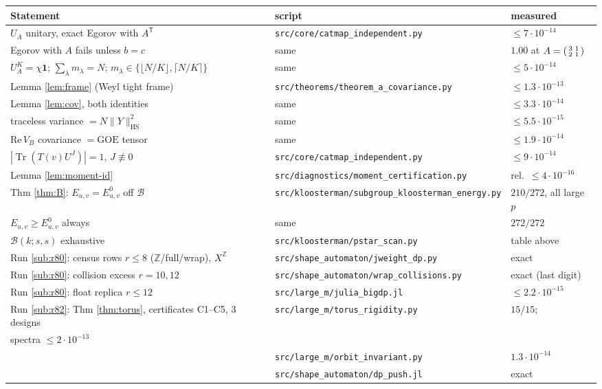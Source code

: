 \documentclass[11pt,reqno]{amsart}
\theoremstyle{definition}
\DeclareMathOperator{\Tr}{Tr}
\DeclareMathOperator{\HS}{HS}
\newcommand{\ZZ}{\mathbb{Z}}
\newcommand{\GOE}{\mathrm{GOE}}
\begin{document}
\begin{center}\small
\begin{tabular}{lll}
\toprule
Statement & script & measured\\
\midrule
$U_A$ unitary, exact Egorov with $A^{\mathsf T}$ &
 \texttt{src/core/catmap\_independent.py} & $\le7\!\cdot\!10^{-14}$\\
Egorov with $A$ fails unless $b=c$ & same & $1.00$ at
 $A=\begin{psmallmatrix}3&1\\2&1\end{psmallmatrix}$\\
$U_A^K=\chi\mathbf 1$; $\sum_\lambda m_\lambda=N$;
 $m_\lambda\in\{\lfloor N/K\rfloor,\lceil N/K\rceil\}$ & same &
 $\le5\!\cdot\!10^{-14}$\\
Lemma \ref{lem:frame} (Weyl tight frame) & \texttt{src/theorems/theorem\_a\_covariance.py} &
 $\le1.3\!\cdot\!10^{-13}$\\
Lemma \ref{lem:cov}, both identities & same & $\le3.3\!\cdot\!10^{-14}$\\
traceless variance $=N\|Y\|^2_{\HS}$ & same & $\le5.5\!\cdot\!10^{-15}$\\
$\mathrm{Re}\,V_B$ covariance $=\GOE$ tensor & same & $\le1.9\!\cdot\!10^{-14}$\\
$|\Tr(T(v)U^J)|=1$, $J\not\equiv0$ & \texttt{src/core/catmap\_independent.py} &
 $\le9\!\cdot\!10^{-14}$\\
Lemma \ref{lem:moment-id} & \texttt{src/diagnostics/moment\_certification.py} &
 rel.\ $\le4\!\cdot\!10^{-16}$\\
Thm \ref{thm:B}: $E_{u,v}=E^0_{u,v}$ off $\mathcal B$ &
 \texttt{src/kloosterman/subgroup\_kloosterman\_energy.py} & $210/272$, all large $p$\\
$E_{u,v}\ge E^0_{u,v}$ always & same & $272/272$\\
$\mathcal B(k;s,s)$ exhaustive & \texttt{src/kloosterman/pstar\_scan.py} & table above\\
Run \ref{sub:r80}: census rows $r\le8$ ($\ZZ$/full/wrap), $X^{\ZZ}$
 & \texttt{src/shape\_automaton/jweight\_dp.py} & exact\\
Run \ref{sub:r80}: collision excess $r=10,12$ & \texttt{src/shape\_automaton/wrap\_collisions.py}
 & exact (last digit)\\
Run \ref{sub:r80}: float replica $r\le12$ & \texttt{src/large\_m/julia\_bigdp.jl} &
 $\le2.2\!\cdot\!10^{-15}$\\
Run \ref{sub:r82}: Thm \ref{thm:torus}, certificates C1--C5,
 3 designs & \texttt{src/large\_m/torus\_rigidity.py} & $15/15$;\\
 spectra $\le2\!\cdot\!10^{-13}$\\
 & \texttt{src/large\_m/orbit\_invariant.py} & $1.3\!\cdot\!10^{-14}$\\
 & \texttt{src/shape\_automaton/dp\_push.jl} & exact\\
\bottomrule
\end{tabular}
\end{center}
\end{document}
